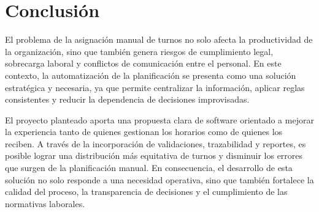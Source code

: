 \documentclass[11pt,letterpaper]{article}
\begin{document}
\FloatBarrier
\section{Conclusión}

El problema de la asignación manual de turnos no solo afecta la productividad de la organización, sino que también genera riesgos de cumplimiento legal, sobrecarga laboral y conflictos de comunicación entre el personal. En este contexto, la automatización de la planificación se presenta como una solución estratégica y necesaria, ya que permite centralizar la información, aplicar reglas consistentes y reducir la dependencia de decisiones improvisadas.

El proyecto planteado aporta una propuesta clara de software orientado a mejorar la experiencia tanto de quienes gestionan los horarios como de quienes los reciben. A través de la incorporación de validaciones, trazabilidad y reportes, es posible lograr una distribución más equitativa de turnos y disminuir los errores que surgen de la planificación manual. En consecuencia, el desarrollo de esta solución no solo responde a una necesidad operativa, sino que también fortalece la calidad del proceso, la transparencia de decisiones y el cumplimiento de las normativas laborales.
\end{document}
